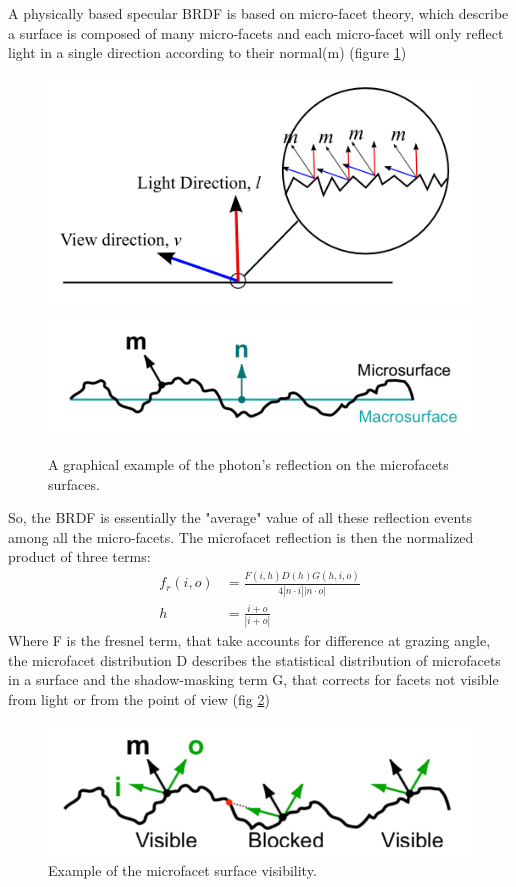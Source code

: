 \documentclass[11pt]{article}
\begin{document}
A physically based specular BRDF is based on micro-facet theory, which describe a surface is composed of many micro-facets and each micro-facet will only reflect light in a single direction according to their normal(m) (figure \ref{fig:microfacet}) \cite{slide,microfacet} 

\begin{figure}[H]
	\centering
	\includegraphics[width=0.5\linewidth]{img/microfacet}
	\includegraphics[width=0.5\linewidth]{img/microfacet2}
	\caption{A graphical example of the photon's reflection on the microfacets surfaces.}
	\label{fig:microfacet}
\end{figure}

So, the BRDF is essentially the "average" value of all these reflection events among all the micro-facets.
The microfacet reflection is then the normalized product of three terms:
\begin{align*}
	f_r(i,o)&=\frac{F(i,h)D(h)G(h,i,o)}{4|n\cdot i||n\cdot o|}\\
	h&= \frac{i+o}{|i+o|}
\end{align*}
Where F is the fresnel term, that take accounts for difference at grazing angle, the microfacet distribution D describes the statistical distribution of microfacets in a surface and the shadow-masking term G, that corrects for facets not visible from light or from the point of view (fig \ref{fig:visible})

\begin{figure}[H]
	\centering
	\includegraphics[width=0.5\linewidth]{img/visible}
	\caption{Example of the microfacet surface visibility.}
	\label{fig:visible}
\end{figure}
\end{document}
